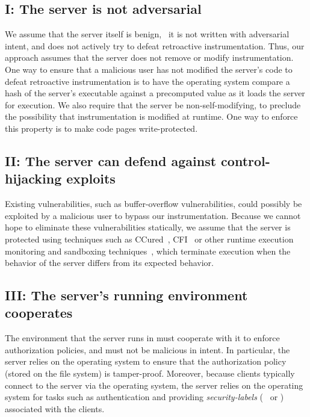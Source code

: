 \subsection*{I: The server is not adversarial}
%
We assume that the server itself is benign, \ie~it is not written with
adversarial intent, and does not actively try to defeat retroactive
instrumentation. Thus, our approach assumes that the server does not remove or
modify instrumentation. One way to ensure that a malicious user has not
modified the server's code to defeat retroactive instrumentation is to have the
operating system compare a hash of the server's executable against a
precomputed value as it loads the server for execution. We also require that
the server be non-self-modifying, to preclude the possibility that
instrumentation is modified at runtime. One way to enforce this property is to
make code pages write-protected.

\subsection*{II: The server can defend against control-hijacking exploits}
%
Existing vulnerabilities, such as buffer-overflow vulnerabilities, could
possibly be exploited by a malicious user to bypass our instrumentation.
Because we cannot hope to eliminate these vulnerabilities statically, we assume
that the server is protected using techniques such as CCured~\cite{nmw02},
CFI~\cite{abe+05} or other runtime execution monitoring and sandboxing
techniques~\cite{fgh+04,fhs+96,lrb+05,sbb+01,wd01}, which terminate execution
when the behavior of the server differs from its expected behavior.

\subsection*{III: The server's running environment cooperates} 
%
The environment that the server runs in must cooperate with it to enforce
authorization policies, and must not be malicious in intent. In particular, the
server relies on the operating system to ensure that the authorization policy
(stored on the file system) is tamper-proof. Moreover, because clients
typically connect to the server via the operating system, the server relies on
the operating system for tasks such as authentication and providing
\textit{security-labels} (\eg~ or )
associated with the clients.  

